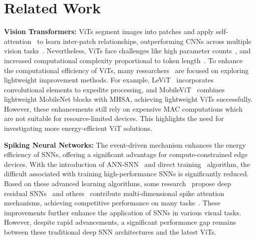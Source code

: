\section{Related Work}
\textbf{Vision Transformers:} ViTs segment images into patches and apply self-attention~\citep{vaswani2017attention, kenton2019bert} to learn inter-patch relationships, outperforming CNNs across multiple vision tasks~\citep{mei2021image, bertasius2021space, guo2021pct}. Nevertheless, ViTs face challenges like high parameter counts~\citep{liu2021swin}, and increased computational complexity proportional to token length~\citep{pan2020x, liu2022ecoformer}. 
To enhance the computational efficiency of ViTs, many researchers~\citep{jie2023fact, li2023rethinking} are focused on exploring lightweight improvement methods. For example, LeViT~\citep{graham2021levit} incorporates convolutional elements to expedite processing, and MobileViT~\citep{mehta2021mobilevit} combines lightweight MobileNet blocks with MHSA, achieving lightweight ViTs successfully. However, these enhancements still rely on expensive MAC computations which are not suitable for resource-limited devices. This highlights the need for investigating more energy-efficient ViT solutions.

\textbf{Spiking Neural Networks:} The event-driven mechanism enhances the energy efficiency of SNNs, offering a significant advantage for compute-constrained edge devices. With the introduction of ANN-SNN~\citep{cao2015spiking, han2020rmp, wu2021progressive} and direct training~\citep{wu2018spatio, fang2021incorporating, zhang2021rectified, wei2023temporal} algorithm, the difficult associated with training high-performance SNNs is significantly reduced.
Based on these advanced learning algorithms, some research~\citep{hu2021spiking,zheng2021going, hu2024advancing} propose deep residual SNNs~\citep{wang2024ternary, shan2024advancing} and others~\citep{yao2023attention,zhu2024tcja,shan2024advancing} contribute multi-dimensional spike attention mechanisms, achieving competitive performance on many tasks~\citep{zhang2024spike}. 
These improvements further enhance the application of SNNs in various visual tasks. However, despite rapid advancements, a significant performance gap remains between these traditional deep SNN architectures and the latest ViTs.

